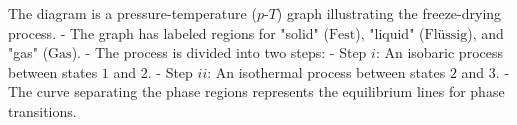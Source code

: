The diagram is a pressure-temperature (\( p \)-\( T \)) graph illustrating the freeze-drying process.  
- The graph has labeled regions for "solid" (\( \text{Fest} \)), "liquid" (\( \text{Flüssig} \)), and "gas" (\( \text{Gas} \)).  
- The process is divided into two steps:  
  - Step \( i \): An isobaric process between states \( 1 \) and \( 2 \).  
  - Step \( ii \): An isothermal process between states \( 2 \) and \( 3 \).  
- The curve separating the phase regions represents the equilibrium lines for phase transitions.